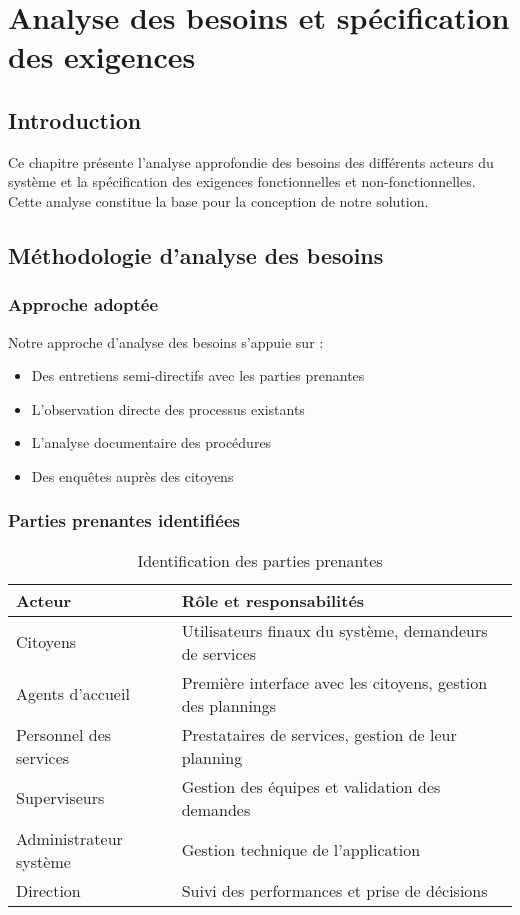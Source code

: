 \chapter{Analyse des besoins et spécification des exigences}

\section{Introduction}

Ce chapitre présente l'analyse approfondie des besoins des différents acteurs du système et la spécification des exigences fonctionnelles et non-fonctionnelles. Cette analyse constitue la base pour la conception de notre solution.

\section{Méthodologie d'analyse des besoins}

\subsection{Approche adoptée}

Notre approche d'analyse des besoins s'appuie sur :
\begin{itemize}
    \item Des entretiens semi-directifs avec les parties prenantes
    \item L'observation directe des processus existants
    \item L'analyse documentaire des procédures
    \item Des enquêtes auprès des citoyens
\end{itemize}

\subsection{Parties prenantes identifiées}

\begin{table}[h]
\centering
\begin{tabular}{|l|p{8cm}|}
\hline
\textbf{Acteur} & \textbf{Rôle et responsabilités} \\
\hline
Citoyens & Utilisateurs finaux du système, demandeurs de services \\
\hline
Agents d'accueil & Première interface avec les citoyens, gestion des plannings \\
\hline
Personnel des services & Prestataires de services, gestion de leur planning \\
\hline
Superviseurs & Gestion des équipes et validation des demandes \\
\hline
Administrateur système & Gestion technique de l'application \\
\hline
Direction & Suivi des performances et prise de décisions \\
\hline
\end{tabular}
\caption{Identification des parties prenantes}
\label{tab:stakeholders}
\end{table}


